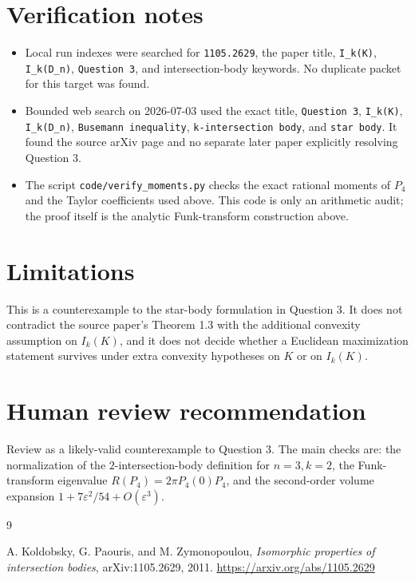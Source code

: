 \documentclass[11pt]{amsart}
\theoremstyle{remark}
\newcommand{\eps}{\varepsilon}
\begin{document}
\section*{Verification notes}

\begin{itemize}[leftmargin=*]
\item Local run indexes were searched for \texttt{1105.2629}, the paper title,
\texttt{I\_k(K)}, \texttt{I\_k(D\_n)}, \texttt{Question 3}, and intersection-body
keywords.  No duplicate packet for this target was found.
\item Bounded web search on 2026-07-03 used the exact title, \texttt{Question 3},
\texttt{I\_k(K)}, \texttt{I\_k(D\_n)}, \texttt{Busemann inequality},
\texttt{k-intersection body}, and \texttt{star body}.  It found the source
arXiv page \cite{KPZ2011} and no separate later paper explicitly resolving
Question 3.
\item The script \texttt{code/verify\_moments.py} checks the exact rational
moments of \(P_4\) and the Taylor coefficients used above.  This code is only
an arithmetic audit; the proof itself is the analytic Funk-transform
construction above.
\end{itemize}

\section*{Limitations}

This is a counterexample to the star-body formulation in Question 3.  It does
not contradict the source paper's Theorem 1.3 with the additional convexity
assumption on \(I_k(K)\), and it does not decide whether a Euclidean
maximization statement survives under extra convexity hypotheses on \(K\) or
on \(I_k(K)\).

\section*{Human review recommendation}

Review as a likely-valid counterexample to Question 3.  The main checks are:
the normalization of the \(2\)-intersection-body definition for
\(n=3,k=2\), the Funk-transform eigenvalue \(R(P_4)=2\pi P_4(0)P_4\), and the
second-order volume expansion \(1+7\eps^2/54+O(\eps^3)\).

\begin{thebibliography}{9}

A. Koldobsky, G. Paouris, and M. Zymonopoulou,
\emph{Isomorphic properties of intersection bodies},
arXiv:1105.2629, 2011.
\url{https://arxiv.org/abs/1105.2629}

\end{thebibliography}
\end{document}
